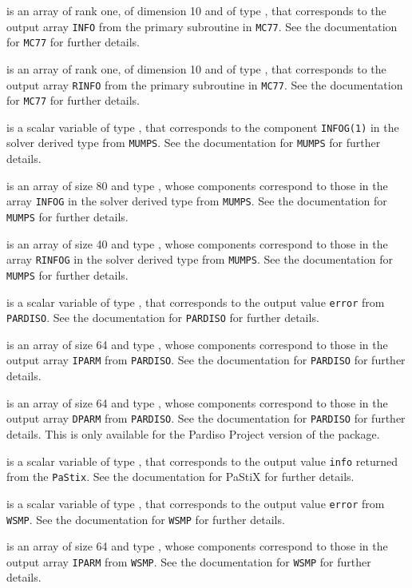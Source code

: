 \documentclass{galahad}
\begin{document}
\begin{description}
 is an array of rank one, of dimension 10 and of
type \integer, that corresponds to the output array {\tt INFO}
from the primary subroutine in {\tt MC77}. See the documentation for
{\tt MC77} for further details.

 is an array of rank one, of dimension 10 and of
type \realdp, that corresponds to the output array {\tt RINFO}
from the primary subroutine in {\tt MC77}. See the documentation for
{\tt MC77} for further details.

 is a scalar variable of type \integer,
that corresponds to the component {\tt INFOG(1)}
in the solver derived type from {\tt MUMPS}. See the documentation for 
{\tt MUMPS} for further details.

 is an array of size 80 and type \integer,
whose components correspond to those in the array {\tt INFOG}
in the solver derived type from {\tt MUMPS}. See the documentation for 
{\tt MUMPS} for further details.

 is an array of size 40 and type \realdp,
whose components correspond to those in the array {\tt RINFOG}
in the solver derived type from {\tt MUMPS}. See the documentation for 
{\tt MUMPS} for further details.

 is a scalar variable of type \integer,
that corresponds to the output value {\tt error}
from {\tt PARDISO}. See the documentation for {\tt PARDISO} for further
details.

 is an array of size 64 and type \integer,
whose components correspond to those in the output array {\tt IPARM}
from {\tt PARDISO}. See the documentation for {\tt PARDISO} for further
details.

 is an array of size 64 and type \realdp,
whose components correspond to those in the output array {\tt DPARM}
from {\tt PARDISO}. See the documentation for {\tt PARDISO} for further
details. This is only available for the Pardiso Project version of the package.

 is a scalar variable of type \integer,
that corresponds to the output value {\tt info} returned from
the {\tt PaStix}.
See the documentation for PaStiX for further details.

 is a scalar variable of type \integer,
that corresponds to the output value {\tt error}
from {\tt WSMP}. See the documentation for {\tt WSMP} for further
details.

 is an array of size 64 and type \integer,
whose components correspond to those in the output array {\tt IPARM}
from {\tt WSMP}. See the documentation for {\tt WSMP} for further
details.


\end{description}
\end{document}

